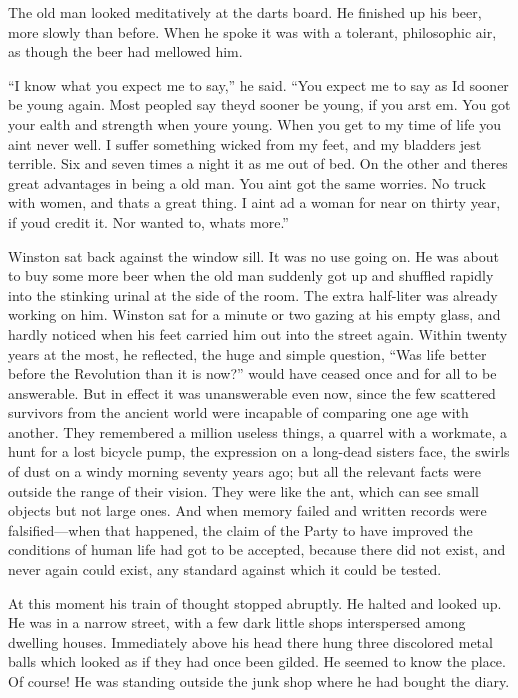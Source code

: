 The old man looked meditatively at the darts board. He finished up his
beer, more slowly than before. When he spoke it was with a tolerant,
philosophic air, as though the beer had mellowed him.

``I know what you expect me to say,'' he said. ``You expect me to say as
I\textquotesingle d sooner be young again. Most people\textquotesingle d
say they\textquotesingle d sooner be young, if you arst
\textquotesingle em. You got your \textquotesingle ealth and strength
when you\textquotesingle re young. When you get to my time of life you
ain\textquotesingle t never well. I suffer something wicked from my
feet, and my bladder\textquotesingle s jest terrible. Six and seven
times a night it \textquotesingle as me out of bed. On the other
\textquotesingle and there\textquotesingle s great advantages in being a
old man. You ain\textquotesingle t got the same worries. No truck with
women, and that\textquotesingle s a great thing. I ain\textquotesingle t
\textquotesingle ad a woman for near on thirty year, if
you\textquotesingle d credit it. Nor wanted to, what\textquotesingle s
more.''

Winston sat back against the window sill. It was no use going on. He was
about to buy some more beer when the old man suddenly got up and
shuffled rapidly into the stinking urinal at the side of the room. The
extra half-liter was already working on him. Winston sat for a minute or
two gazing at his empty glass, and hardly noticed when his feet carried
him out into the street again. Within twenty years at the most, he
reflected, the huge and simple question, ``Was life better before the
Revolution than it is now?'' would have ceased once and for all to be
answerable. But in effect it was unanswerable even now, since the few
scattered survivors from the ancient world were incapable of comparing
one age with another. They remembered a million useless things, a
quarrel with a workmate, a hunt for a lost bicycle pump, the expression
on a long-dead sister\textquotesingle s face, the swirls of dust on a
windy morning seventy years ago; but all the relevant facts were outside
the range of their vision. They were like the ant, which can see small
objects but not large ones. And when memory failed and written records
were falsified---when that happened, the claim of the Party to have
improved the conditions of human life had got to be accepted, because
there did not exist, and never again could exist, any standard against
which it could be tested.

At this moment his train of thought stopped abruptly. He halted and
looked up. He was in a narrow street, with a few dark little shops
interspersed among dwelling houses. Immediately above his head there
hung three discolored metal balls which looked as if they had once been
gilded. He seemed to know the place. Of course! He was standing outside
the junk shop where he had bought the diary.

